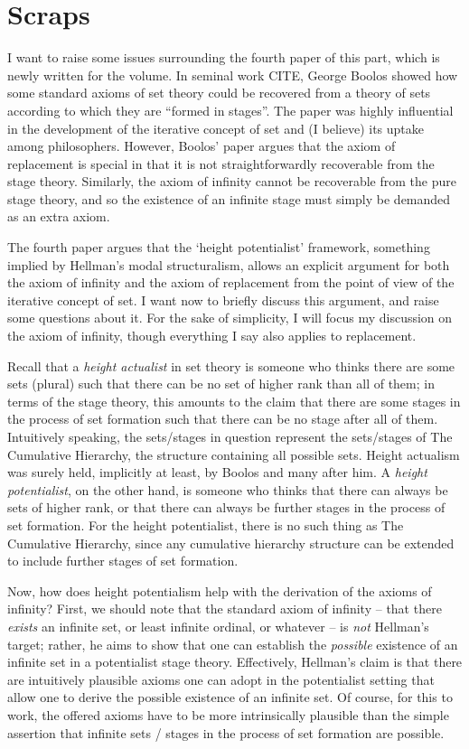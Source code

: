 \documentclass{asl}
\theoremstyle{definition}
\begin{document}
\section{Scraps}
I want to raise some issues surrounding the fourth paper of this part, which is newly written for the volume. In seminal work CITE, George Boolos showed how some standard axioms of set theory could be recovered from a theory of sets according to which they are ``formed in stages''. The paper was highly influential in the development of the iterative concept of set and (I believe) its uptake among philosophers. However, Boolos' paper argues that the axiom of replacement is special in that it is not straightforwardly recoverable from the stage theory. Similarly, the axiom of infinity cannot be recoverable from the pure stage theory, and so the existence of an infinite stage must simply be demanded as an extra axiom. 

The fourth paper argues that the `height potentialist' framework, something implied by Hellman's modal structuralism, allows an explicit argument for both the axiom of infinity and the axiom of replacement from the point of view of the iterative concept of set. I want now to briefly discuss this argument, and raise some questions about it. For the sake of simplicity, I will focus my discussion on the axiom of infinity, though everything I say also applies to replacement.

Recall that a \emph{height actualist} in set theory is someone who thinks there are some sets (plural) such that there can be no set of higher rank than all of them; in terms of the stage theory, this amounts to the claim that there are some stages in the process of set formation such that there can be no stage after all of them. Intuitively speaking, the sets/stages in question represent the sets/stages of The Cumulative Hierarchy, the structure containing all possible sets. Height actualism was surely held, implicitly at least, by Boolos and many after him. A \emph{height potentialist}, on the other hand, is someone who thinks that there can always be sets of higher rank, or that there can always be further stages in the process of set formation. For the height potentialist, there is no such thing as The Cumulative Hierarchy, since any cumulative hierarchy structure can be extended to include further stages of set formation.

Now, how does height potentialism help with the derivation of the axioms of infinity? First, we should note that the standard axiom of infinity -- that there \emph{exists} an infinite set, or least infinite ordinal, or whatever -- is \emph{not} Hellman's target; rather, he aims to show that one can establish the \emph{possible} existence of an infinite set in a potentialist stage theory. Effectively, Hellman's claim is that there are intuitively plausible axioms one can adopt in the potentialist setting that allow one to derive the possible existence of an infinite set. Of course, for this to work, the offered axioms have to be more intrinsically plausible than the simple assertion that infinite sets / stages in the process of set formation are possible.
\end{document}
